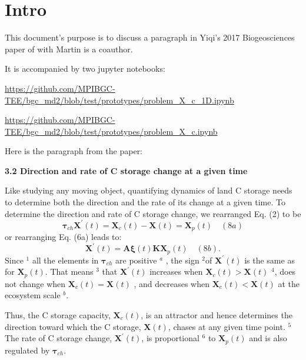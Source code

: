 \documentclass{article}
\newcommand{\oc}[2]{{\color{red} #1  $^{#2}$}}
\newcommand{\cc}[2]{{\color{green} #1  $^{#2}$}}
\newcommand{\X}{\mathbf{X}}
\begin{document}
\section{Intro}
This document's purpose is to discuss a paragraph in Yiqi's 2017 Biogeosciences paper
of with Martin is a coauthor.

It is accompanied by two jupyter notebooks:

\url{https://github.com/MPIBGC-TEE/bgc_md2/blob/test/prototypes/problem_X_c_1D.ipynb}

\url{https://github.com/MPIBGC-TEE/bgc_md2/blob/test/prototypes/problem_X_c.ipynb}

Here is the paragraph from the paper:


{\bf 3.2 Direction and rate of C storage change at a given time}

Like studying any moving object, quantifying dynamics of land C storage needs to determine both the direction and the rate of its change at a given time. To determine the direction
and rate of C storage change, we rearranged Eq. (2) to be 
$$
\mathbf{ \tau }_{ch} \X^{\prime}(t) = \X_c (t) - \X(t) = \X_p (t)
\quad (8a)
$$ 
or rearranging Eq. (6a) leads to:
$$
\X^{\prime}(t) = \mathbf{A \xi }(t)\mathbf{K X}_p (t)
\quad (8b) .
$$
\oc{Since}{1} 
\cc{all the elements in $\mathbf{\tau}_{ch}$ are positive}{a}
, the \oc{sign}{2}of $\X^{\prime} (t)$ is
the same as for $\X_p (t)$.
\oc{That means}{3} that \oc{$\X^{\prime}(t)$ increases when
$\X_c (t) > \X(t)$} {4}, does not change when $\X_c (t) = \X(t)$ , and decreases when $\X_c(t) < \X(t)$ \cc{at the ecosystem scale}{b}. 

\oc{Thus, the C storage capacity, $\X_c(t)$, is an attractor and hence determines the direction toward which the C storage, $\X(t)$, chases
at any given time point.}{5} 
The rate of C storage change, $\X^{\prime}(t)$,
is \oc{proportional}{6} to $\X_p(t)$ and is also regulated by $\mathbf{\tau}_{ch}.$
\\
\end{document}
